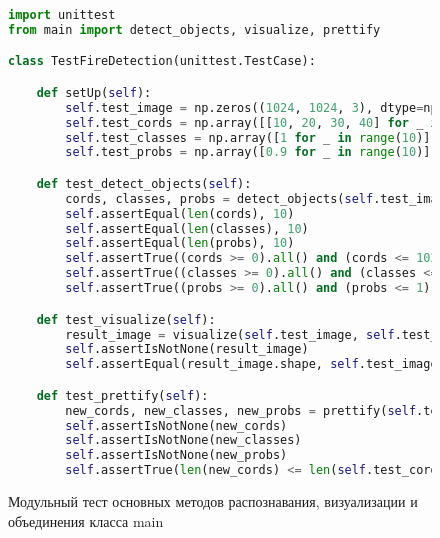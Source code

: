 \begin{figure}[H]
\begin{lstlisting}[language=Python]
import unittest
from main import detect_objects, visualize, prettify

class TestFireDetection(unittest.TestCase):

    def setUp(self):
        self.test_image = np.zeros((1024, 1024, 3), dtype=np.uint8)
        self.test_cords = np.array([[10, 20, 30, 40] for _ in range(10)])
        self.test_classes = np.array([1 for _ in range(10)])
        self.test_probs = np.array([0.9 for _ in range(10)])

    def test_detect_objects(self):
        cords, classes, probs = detect_objects(self.test_image)
        self.assertEqual(len(cords), 10)
        self.assertEqual(len(classes), 10)
        self.assertEqual(len(probs), 10)
        self.assertTrue((cords >= 0).all() and (cords <= 1024).all())
        self.assertTrue((classes >= 0).all() and (classes <= 1).all())
        self.assertTrue((probs >= 0).all() and (probs <= 1).all())

    def test_visualize(self):
        result_image = visualize(self.test_image, self.test_cords, self.test_classes, self.test_probs)
        self.assertIsNotNone(result_image)
        self.assertEqual(result_image.shape, self.test_image.shape)

    def test_prettify(self):
        new_cords, new_classes, new_probs = prettify(self.test_cords, self.test_classes, self.test_probs)
        self.assertIsNotNone(new_cords)
        self.assertIsNotNone(new_classes)
        self.assertIsNotNone(new_probs)
        self.assertTrue(len(new_cords) <= len(self.test_cords))
\end{lstlisting}  
\caption{Модульный тест основных методов распознавания, визуализации и объединения класса main}
\label{test1:image}
\end{figure}

